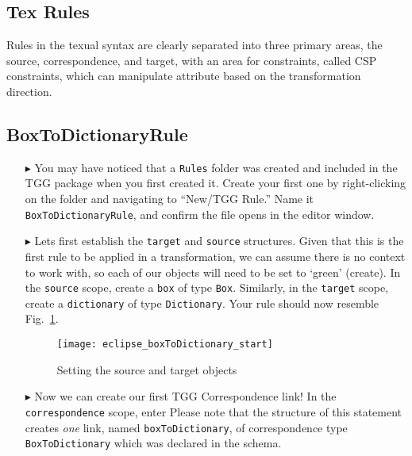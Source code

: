 \newpage
\hypertarget{rules tex}{}
\subsection{Tex Rules}
\texHeader

Rules in the texual syntax are clearly separated into three primary areas, the source, correspondence, and target, with an area for constraints, called CSP
constraints, which can manipulate attribute based on the transformation direction.

\subsection{BoxToDictionaryRule}

\begin{itemize}

\item[$\blacktriangleright$] You may have noticed that a \texttt{Rules} folder was created and included in the TGG package when you first created it. Create
your first one by right-clicking on the folder and navigating to ``New/TGG Rule.'' Name it \texttt{BoxToDictionaryRule}, and confirm the file opens in the
editor window.

\item[$\blacktriangleright$] Lets first establish the \texttt{target} and \texttt{source} structures. Given that this is the first rule to be applied in a
transformation, we can assume there is no context to work with, so each of our objects will need to be set to `green' (create). In the \texttt{source} scope,
create a \texttt{box} of type \texttt{Box}. Similarly, in the \texttt{target} scope, create a \texttt{dictionary} of type \texttt{Dictionary}. Your rule
should now resemble Fig.~\ref{fig:textSourceRule}.

\vspace{0.5cm}

\begin{figure}[htbp]
\begin{center}
  \texttt{[image: eclipse\_boxToDictionary\_start]}
  \caption{Setting the source and target objects}
  \label{fig:textSourceRule}
\end{center}
\end{figure}

\item[$\blacktriangleright$] Now we can create our first TGG Correspondence link! In the \texttt{correspondence} scope, enter 
Please note that the structure of this statement creates \emph{one} link, named \texttt{boxToDictionary}, of correspondence type \texttt{BoxToDictionary} which
was declared in the schema.

\end{itemize}


